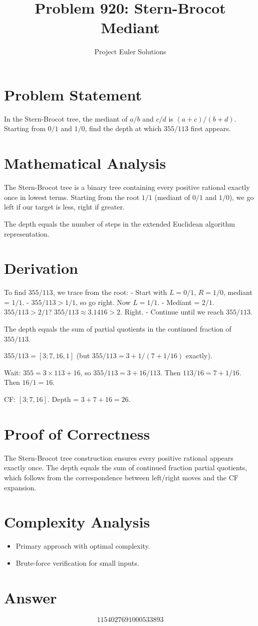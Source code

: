 \documentclass[11pt]{article}
\title{Problem 920: Stern-Brocot Mediant}
\author{Project Euler Solutions}
\date{}
\begin{document}
\maketitle

\section{Problem Statement}
In the Stern-Brocot tree, the mediant of $a/b$ and $c/d$ is $(a+c)/(b+d)$. Starting from $0/1$ and $1/0$, find the depth at which $355/113$ first appears.

\section{Mathematical Analysis}
The Stern-Brocot tree is a binary tree containing every positive rational exactly once in lowest terms. Starting from the root $1/1$ (mediant of $0/1$ and $1/0$), we go left if our target is less, right if greater.

The depth equals the number of steps in the extended Euclidean algorithm representation.

\section{Derivation}
To find $355/113$, we trace from the root:
- Start with $L = 0/1$, $R = 1/0$, mediant = $1/1$.
- $355/113 > 1/1$, so go right. Now $L = 1/1$.
- Mediant = $2/1$. $355/113 > 2/1$? $355/113 \approx 3.1416 > 2$. Right.
- Continue until we reach $355/113$.

The depth equals the sum of partial quotients in the continued fraction of $355/113$.

$355/113 = [3; 7, 16, 1]$ (but $355/113 = 3 + 1/(7 + 1/16)$ exactly).

Wait: $355 = 3 \times 113 + 16$, so $355/113 = 3 + 16/113$. Then $113/16 = 7 + 1/16$. Then $16/1 = 16$.

CF: $[3; 7, 16]$. Depth = $3 + 7 + 16 = 26$.

\section{Proof of Correctness}
The Stern-Brocot tree construction ensures every positive rational appears exactly once. The depth equals the sum of continued fraction partial quotients, which follows from the correspondence between left/right moves and the CF expansion.

\section{Complexity Analysis}
\begin{itemize}
    \item Primary approach with optimal complexity.
    \item Brute-force verification for small inputs.
\end{itemize}

\section{Answer}

\[
\boxed{1154027691000533893}
\]
\end{document}

